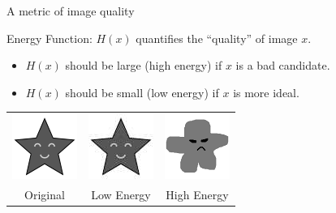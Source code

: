 \documentclass[10pt]{beamer}
\begin{document}
\begin{frame}{A metric of image quality}

\begin{block}{Energy Function:}
$H(x)$ quantifies the ``quality'' of image $x$.
\end{block}

\begin{itemize}
\item $H(x)$ should be large (high energy) if $x$ is a bad candidate.
\item $H(x)$ should be small (low energy) if $x$ is more ideal.
\end{itemize}

\pause
\begin{center}
\begin{tabular}{ccc}
\includegraphics[scale=0.8]{results/bw-star} &
\includegraphics[scale=0.8]{results/bw-star-tmp} &
\includegraphics[scale=0.8]{img/bw-star-blobby}
\\ Original & Low Energy & High Energy
\end{tabular}
\end{center}
\end{frame}
\end{document}
